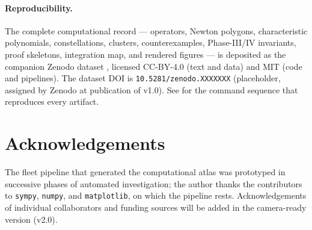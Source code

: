 \documentclass[11pt,a4paper]{article}
\theoremstyle{plain}
\theoremstyle{definition}
\theoremstyle{remark}
\begin{document}
\paragraph{Reproducibility.}
The complete computational record --- operators, Newton polygons,
characteristic polynomials, constellations, clusters, counterexamples,
Phase-III/IV invariants, proof skeletons, integration map, and
rendered figures --- is deposited as the companion Zenodo dataset
\cite{wkb_dataset_v1}, licensed CC-BY-4.0 (text and data) and MIT
(code and pipelines). The dataset DOI is \texttt{10.5281/zenodo.XXXXXXX}
(placeholder, assigned by Zenodo at publication of v1.0). See
 for the command sequence that reproduces
every artifact.


\section*{Acknowledgements}\label{sec:ack}

The fleet pipeline that generated the computational atlas was prototyped
in successive phases of automated investigation; the author thanks the
contributors to \texttt{sympy}, \texttt{numpy}, and \texttt{matplotlib},
on which the pipeline rests. Acknowledgements of individual collaborators
and funding sources will be added in the camera-ready version (v2.0).




\end{document}

